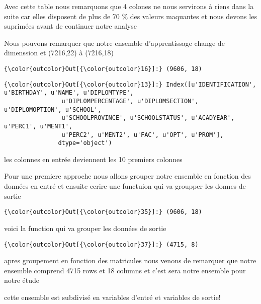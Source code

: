 \documentclass[11pt]{article}
\begin{document}
    Avec cette table nous remarquons que 4 colones ne nous servirons à riens
dans la suite car elles disposent de plus de 70 \% des valeurs maquantes
et nous devons les suprimées avant de continuer notre analyse

    Nous pouvons remarquer que notre ensemble d'apprentissage change de
dimenssion et (7216,22) à (7216,18)

            \begin{Verbatim}[commandchars=\\\{\}]
{\color{outcolor}Out[{\color{outcolor}16}]:} (9606, 18)
\end{Verbatim}
        
            \begin{Verbatim}[commandchars=\\\{\}]
{\color{outcolor}Out[{\color{outcolor}13}]:} Index([u'IDENTIFICATION', u'BIRTHDAY', u'NAME', u'DIPLOMTYPE',
                u'DIPLOMPERCENTAGE', u'DIPLOMSECTION', u'DIPLOMOPTION', u'SCHOOL',
                u'SCHOOLPROVINCE', u'SCHOOLSTATUS', u'ACADYEAR', u'PERC1', u'MENT1',
                u'PERC2', u'MENT2', u'FAC', u'OPT', u'PROM'],
               dtype='object')
\end{Verbatim}
        
    les colonnes en entrée deviennent les 10 premiers colonnes

    Pour une premiere approche nous allons grouper notre ensemble en
fonction des données en entré et ensuite ecrire une functuion qui va
groupper les donnes de sortie

            \begin{Verbatim}[commandchars=\\\{\}]
{\color{outcolor}Out[{\color{outcolor}35}]:} (9606, 18)
\end{Verbatim}
        
    voici la function qui va grouper les données de sortie

            \begin{Verbatim}[commandchars=\\\{\}]
{\color{outcolor}Out[{\color{outcolor}37}]:} (4715, 8)
\end{Verbatim}
        
    apres groupement en fonction des matricules nous venons de remarquer que
notre ensemble comprend 4715 rows et 18 columns et c'est sera notre
ensemble pour notre étude

    cette ensemble est subdivisé en variables d'entré et variables de
sortie!
\end{document}
